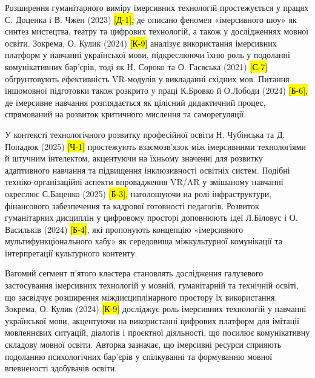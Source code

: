 Розширення гуманітарного виміру імерсивних технологій простежується у працях С. Доценка і В. Чжен (2023) \hl{{[}Д-1{]},} де описано феномен «імерсивного шоу» як синтез мистецтва, театру та цифрових технологій, а також у дослідженнях мовної освіти. Зокрема, О. Кулик (2024) \hl{{[}К-9{]}} аналізує використання імерсивних платформ у навчанні української мови, підкреслюючи їхню роль у подоланні комунікативних бар'єрів, тоді як Н. Сороко та О. Гаєвська (2021) \hl{{[}С-7{]}} обґрунтовують ефективність VR-модулів у викладанні східних мов. Питання іншомовної підготовки також розкрито у праці К.Бровко й О.Лободи (2024) \hl{{[}Б-6{]},} де імерсивне навчання розглядається як цілісний дидактичний процес, спрямований на розвиток критичного мислення та саморегуляції.

У контексті технологічного розвитку професійної освіти Н. Чубінська та Д. Попадюк (2025) \hl{{[}Ч-1{]}} простежують взаємозв'язок між імерсивними технологіями й штучним інтелектом, акцентуючи на їхньому значенні для розвитку адаптивного навчання та підвищення інклюзивності освітніх систем. Подібні техніко-організаційні аспекти впровадження VR/AR у змішаному навчанні окреслює С.Баценко (2025) \hl{{[}Б-3{]},} наголошуючи на ролі інфраструктури, фінансового забезпечення та кадрової готовності педагогів. Розвиток гуманітарних дисциплін у цифровому просторі доповнюють ідеї Л.Біловус і О. Васильків (2024) \hl{{[}Б-4{]}}, які пропонують концепцію «імерсивного мультифункціонального хабу» як середовища міжкультурної комунікації та інтерпретації культурного контенту.

Вагомий сегмент п'ятого кластера становлять дослідження галузевого застосування імерсивних технологій у мовній, гуманітарній та технічній освіті, що засвідчує розширення міждисциплінарного простору їх використання. Зокрема, О. Кулик (2024) \hl{{[}К-9{]}} досліджує роль імерсивних технологій у навчанні української мови, акцентуючи на використанні цифрових платформ для імітації мовленнєвих ситуацій, діалогів і проєктної діяльності, що посилює комунікативну складову мовної освіти. Авторка зазначає, що імерсивні ресурси сприяють подоланню психологічних бар'єрів у спілкуванні та формуванню мовної впевненості здобувачів освіти.

